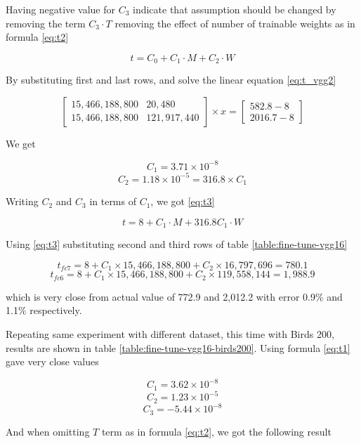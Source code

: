 Having negative value for \( C_3 \) indicate that assumption should be changed by removing the term \(C_3 \cdot T\)
removing the effect of number of trainable weights as in formula \ref{eq:t2}

\begin{equation}
t = C_0 + C_1 \cdot M + C_2 \cdot W
\label{eq:t2}
\end{equation}

By substituting first and last rows, and solve the linear equation \ref{eq:t_vgg2}

\begin{equation}
\begin{bmatrix}
15,466,188,800 &      20,480 \\
15,466,188,800 & 121,917,440 
\end{bmatrix}
\times x = 
\begin{bmatrix}
 582.8-8 \\
2016.7-8
\end{bmatrix}
\label{eq:t_vgg2}
\end{equation}

We get

\[C_1=3.71\times 10^{-8} \]
\[C_2=1.18\times 10^{-5} = 316.8 \times C_1 \]

Writing \(C_2\) and \(C_3\) in terms of \(C_1\), we got \ref{eq:t3}

\begin{equation}
t = 8 + C_1 \cdot M + 316.8  C_1 \cdot W
\label{eq:t3}
\end{equation}

Using \ref{eq:t3} substituting second and third rows of table \ref{table:fine-tune-vgg16} 

\[ t_{fc7} = 8 + C_1 \times 15,466,188,800 + C_2 \times  16,797,696 =   780.1 \]
\[ t_{fc6} = 8 + C_1 \times 15,466,188,800 + C_2 \times 119,558,144 = 1,988.9 \]

which is very close from actual value of 772.9 and 2,012.2 with error 0.9\% and 1.1\% respectively.

Repeating same experiment with different dataset, this time with Birds 200\autocite{WahCUB_200_2011},
results are shown in table \ref{table:fine-tune-vgg16-birds200}. Using formula \ref{eq:t1} gave very close values

\[ C_1 = 3.62\times 10^{-8} \]
\[ C_2 = 1.23\times 10^{-5} \]
\[ C_3 = -5.44\times 10^{-8} \]

And when omitting \(T\) term as in formula \ref{eq:t2}, we got the following result

